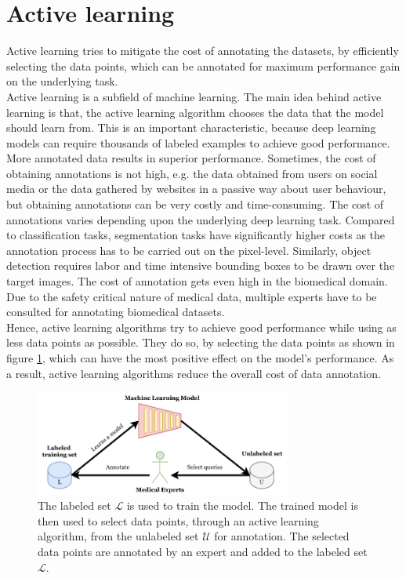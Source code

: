 \section{Active learning}
Active learning\cite{settles2009} tries to mitigate the cost of annotating the datasets, by efficiently selecting the data points, which can be annotated for maximum performance gain on the underlying task. \\
Active learning is a subfield of machine learning. The main idea behind active learning is that, the active learning algorithm chooses the data that the model should learn from. This is an important characteristic, because deep learning models can require thousands of labeled examples to achieve good performance. More annotated data results in superior performance. Sometimes, the cost of obtaining annotations is not high, e.g. the data obtained from users on social media or the data gathered by websites in a passive way about user behaviour, but obtaining annotations can be very costly and time-consuming. The cost of annotations varies depending upon the underlying deep learning task. Compared to classification tasks, segmentation tasks have significantly higher costs as the annotation process has to be carried out on the pixel-level. Similarly, object detection requires labor and time intensive bounding boxes to be drawn over the target images. The cost of annotation gets even high in the biomedical domain. Due to the safety critical nature of medical data, multiple experts have to be consulted for annotating biomedical datasets. \\
Hence, active learning algorithms try to achieve good performance while using as less data points as possible. They do so, by selecting the data points as shown in figure \ref{fig:active_learning}, which can have the most positive effect on the model's performance. As a result, active learning algorithms reduce the overall cost of data annotation.

\begin{figure}[htbp]
\centering
\captionsetup{format=plain}
\includegraphics[width=0.75\textwidth]{figures/fig_active_learning.pdf}
\caption{The labeled set $\mathcal{L}$ is used to train the model. The trained model is then used to select data points, through an active learning algorithm, from the unlabeled set $\mathcal{U}$ for annotation. The selected data points are annotated by an expert and added to the labeled set $\mathcal{L}$.}
\label{fig:active_learning}
\end{figure}

